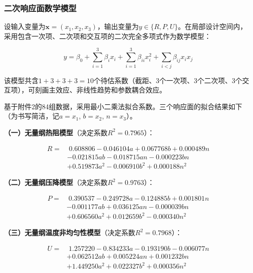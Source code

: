 \documentclass[12pt,a4paper]{ctexart}
\begin{document}
\subsubsection{二次响应面数学模型}

设输入变量为$\boldsymbol{x} = (x_1,x_2,x_3)$，输出变量为$y \in \{R,P,U\}$。在局部设计空间内，采用包含一次项、二次项和交互项的二次完全多项式作为数学模型：

\begin{equation}
y = \beta_0 + \sum_{i=1}^{3}\beta_i x_i + \sum_{i=1}^{3}\beta_{ii}x_i^2 + \sum_{i<j}\beta_{ij}x_i x_j
\end{equation}

该模型共含$1+3+3+3=10$个待估系数（截距、3个一次项、3个二次项、3个交互项），可刻画主效应、非线性趋势和参数耦合效应。

基于附件2的84组数据，采用最小二乘法拟合系数。三个响应面的拟合结果如下（为书写简洁，记$a=x_1$, $b=x_2$, $n=x_3$）。

\textbf{（一）无量纲热阻模型}（决定系数$R^2=0.7965$）：

\begin{equation}
\begin{aligned}
R = &\; 0.608806 - 0.046104a + 0.067768b + 0.000489n \\
     &- 0.021815ab - 0.018715an - 0.000223bn \\
     &+ 0.519873a^2 - 0.006910b^2 + 0.000188n^2
\end{aligned}
\end{equation}

\textbf{（二）无量纲压降模型}（决定系数$R^2=0.9763$）：

\begin{equation}
\begin{aligned}
P = &\; 0.390537 - 0.249728a - 0.124885b + 0.001801n \\
     &- 0.001177ab + 0.036125an - 0.000039bn \\
     &+ 0.606560a^2 + 0.012659b^2 - 0.000340n^2
\end{aligned}
\end{equation}

\textbf{（三）无量纲温度非均匀性模型}（决定系数$R^2=0.7968$）：

\begin{equation}
\begin{aligned}
U = &\; 1.257220 - 0.834233a - 0.193190b - 0.006077n \\
     &+ 0.062512ab + 0.005224an + 0.001232bn \\
     &+ 1.449250a^2 + 0.022327b^2 + 0.000356n^2
\end{aligned}
\end{equation}
\end{document}
